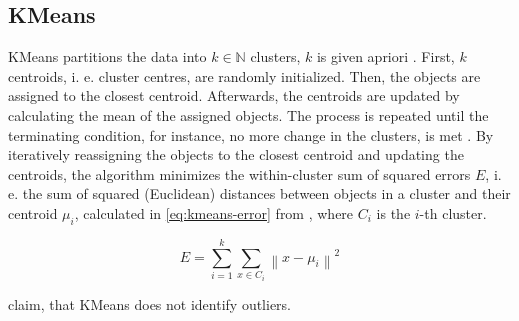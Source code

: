 \subsection{KMeans}\label{subsec:kmeans}

KMeans partitions the data into $k \in \mathbb{N}$  clusters, $k$ is given apriori \cite{OPTICS_kMeans_2016,clusteringDocs2020}. %
First, $k$ centroids, i. e. cluster centres, are randomly initialized.
Then, the objects are assigned to the closest centroid.
Afterwards, the centroids are updated by calculating the mean of the assigned objects.
The process is repeated until the terminating condition, for instance, no more change in the clusters, is met \cite{OPTICS_kMeans_2016}.
By iteratively reassigning the objects to the closest centroid and updating the centroids, 
the algorithm minimizes the within-cluster sum of squared errors $E$, i. e. the sum of squared (Euclidean) distances between objects in a cluster and their centroid $\mu_{i}$, 
calculated in \autoref{eq:kmeans-error} from \cite{OPTICS_kMeans_2016}, 
where $C_{i}$ is the $i$-th cluster.

\begin{equation}
    E = \sum_{i=1}^{k} \sum_{x \in C_{i}}\left\|x-\mu_{i}\right\|^{2}
\label{eq:kmeans-error}
\end{equation}

\citeauthor{OPTICS_kMeans_2016} claim, that KMeans does not identify outliers.